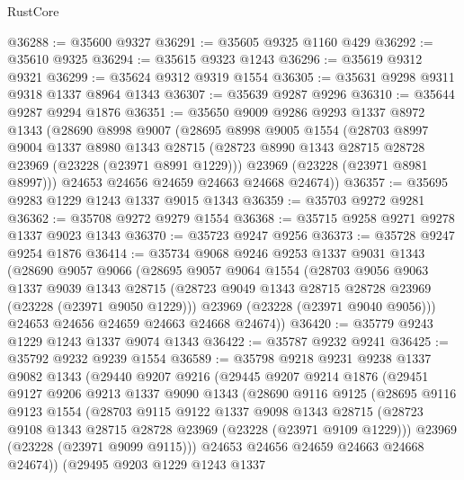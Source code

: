 \begin{lexlean}{RustCore}
\begin{coremodule}
@36288 := @35600 @9327
@36291 := @35605 @9325 @1160 @429
@36292 := @35610 @9325
@36294 := @35615 @9323 @1243
@36296 := @35619 @9312 @9321
@36299 := @35624 @9312 @9319 @1554
@36305 := @35631 @9298 @9311 @9318 @1337 @8964 @1343
@36307 := @35639 @9287 @9296
@36310 := @35644 @9287 @9294 @1876
@36351 := @35650
    @9009
    @9286
    @9293
    @1337
    @8972
    @1343
    (@28690
      @8998
      @9007
      (@28695
        @8998
        @9005
        @1554
        (@28703
          @8997
          @9004
          @1337
          @8980
          @1343
          @28715
          (@28723 @8990 @1343 @28715 @28728 @23969 (@23228 (@23971 @8991 @1229)))
          @23969
          (@23228 (@23971 @8981 @8997)))
        @24653
        @24656
        @24659
        @24663
        @24668
        @24674))
@36357 := @35695 @9283 @1229 @1243 @1337 @9015 @1343
@36359 := @35703 @9272 @9281
@36362 := @35708 @9272 @9279 @1554
@36368 := @35715 @9258 @9271 @9278 @1337 @9023 @1343
@36370 := @35723 @9247 @9256
@36373 := @35728 @9247 @9254 @1876
@36414 := @35734
    @9068
    @9246
    @9253
    @1337
    @9031
    @1343
    (@28690
      @9057
      @9066
      (@28695
        @9057
        @9064
        @1554
        (@28703
          @9056
          @9063
          @1337
          @9039
          @1343
          @28715
          (@28723 @9049 @1343 @28715 @28728 @23969 (@23228 (@23971 @9050 @1229)))
          @23969
          (@23228 (@23971 @9040 @9056)))
        @24653
        @24656
        @24659
        @24663
        @24668
        @24674))
@36420 := @35779 @9243 @1229 @1243 @1337 @9074 @1343
@36422 := @35787 @9232 @9241
@36425 := @35792 @9232 @9239 @1554
@36589 := @35798
    @9218
    @9231
    @9238
    @1337
    @9082
    @1343
    (@29440
      @9207
      @9216
      (@29445
        @9207
        @9214
        @1876
        (@29451
          @9127
          @9206
          @9213
          @1337
          @9090
          @1343
          (@28690
            @9116
            @9125
            (@28695
              @9116
              @9123
              @1554
              (@28703
                @9115
                @9122
                @1337
                @9098
                @1343
                @28715
                (@28723 @9108 @1343 @28715 @28728 @23969 (@23228 (@23971 @9109 @1229)))
                @23969
                (@23228 (@23971 @9099 @9115)))
              @24653
              @24656
              @24659
              @24663
              @24668
              @24674))
          (@29495
            @9203
            @1229
            @1243
            @1337

\end{coremodule}
\end{lexlean}
